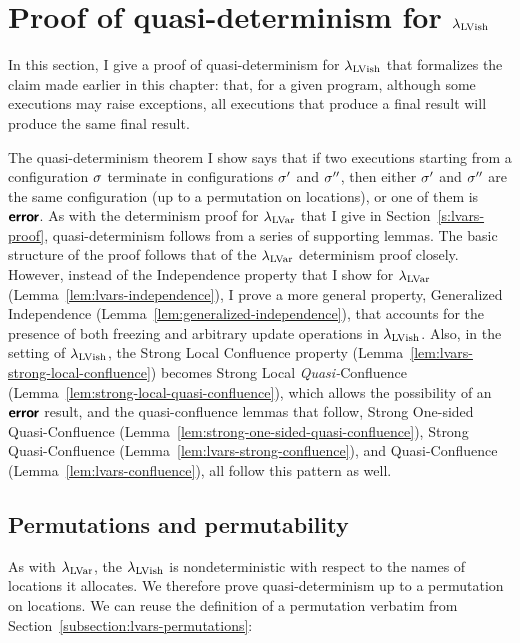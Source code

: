 \section{Proof of quasi-determinism for $\lambda_{\textrm{LVish}}$}\label{s:quasi-proof-of-quasi-determinism}

In this section, I give a proof of quasi-determinism for
$\lambda_{\textrm{LVish}}$ that formalizes the claim made earlier in this chapter:
that, for a given program, although some executions may raise
exceptions, all executions that produce a final result will produce
the same final result.

The quasi-determinism theorem I show says that if two executions
starting from a configuration $\sigma$ terminate in configurations
$\sigma'$ and $\sigma''$, then either $\sigma'$ and $\sigma''$ are the
same configuration (up to a permutation on locations), or one of them
is $\textbf{\textsf{error}}$.  As with the determinism proof for $\lambda_{\textrm{LVar}}$ that I
give in Section~\ref{s:lvars-proof}, quasi-determinism follows from a
series of supporting lemmas.  The basic structure of the proof follows
that of the $\lambda_{\textrm{LVar}}$ determinism proof closely.  However, instead
of the Independence property that I show for $\lambda_{\textrm{LVar}}$
(Lemma~\ref{lem:lvars-independence}), I prove a more general property,
Generalized Independence (Lemma~\ref{lem:generalized-independence}),
that accounts for the presence of both freezing and arbitrary update
operations in $\lambda_{\textrm{LVish}}$.  Also, in the setting of $\lambda_{\textrm{LVish}}$,
the Strong Local Confluence property
(Lemma~\ref{lem:lvars-strong-local-confluence}) becomes Strong Local
\emph{Quasi-}Confluence
(Lemma~\ref{lem:strong-local-quasi-confluence}), which allows the
possibility of an $\textbf{\textsf{error}}$ result, and the quasi-confluence lemmas
that follow, Strong One-sided Quasi-Confluence
(Lemma~\ref{lem:strong-one-sided-quasi-confluence}), Strong
Quasi-Confluence (Lemma~\ref{lem:lvars-strong-confluence}), and
Quasi-Confluence (Lemma~\ref{lem:lvars-confluence}), all follow this
pattern as well.

\subsection{Permutations and permutability}\label{subsection:quasi-permutations}

As with $\lambda_{\textrm{LVar}}$, the $\lambda_{\textrm{LVish}}$ is nondeterministic with
respect to the names of locations it allocates.  We therefore prove
quasi-determinism up to a permutation on locations.  We can reuse the
definition of a permutation verbatim from
Section~\ref{subsection:lvars-permutations}:


